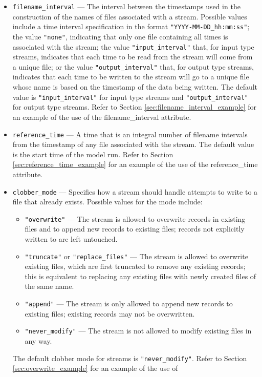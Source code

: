 \begin{itemize}
\item {\tt filename\_interval} --- The interval between the timestamps used in the construction of the names of files associated with
a stream. Possible values include a time interval specification in the format {\tt "YYYY-MM-DD\_hh:mm:ss"}; the value {\tt "none"}, indicating
that only one file containing all times is associated with the stream; the value {\tt "input\_interval"} that, for input type streams, indicates that
each time to be read from the stream will come from a unique file; or the value {\tt "output\_interval"} that, for output type streams, indicates 
that each time to be written to the stream will go to a unique file whose name is based on the timestamp of the data being written. The default
value is {\tt "input\_interval"} for input type streams and {\tt "output\_interval"} for output type streams. Refer to Section \ref{sec:filename_interval_example}
for an example of the use of the filename\_interval attribute.
\item {\tt reference\_time} --- A time that is an integral number of filename intervals from the timestamp of any file associated with the stream.
The default value is the start time of the model run. Refer to Section \ref{sec:reference_time_example} for an example of the use of the reference\_time
attribute.
\item {\tt clobber\_mode} --- Specifies how a stream should handle attempts to write to a file that already exists. Possible values
for the mode include:
\begin{itemize}
\item {\tt "overwrite"} --- The stream is allowed to overwrite records in existing files and to append new records 
to existing files; records not explicitly written to are left untouched.
\item {\tt "truncate"} or {\tt "replace\_files"} --- The stream is allowed to overwrite existing files, which are first truncated 
to remove any existing records; this is equivalent to replacing any existing files with newly created files of the same name.
\item {\tt "append"} --- The stream is only allowed to append new records to existing files; existing records may not be overwritten.
\item {\tt "never\_modify"} --- The stream is not allowed to modify existing files in any way.
\end{itemize}
The default clobber mode for streams is {\tt "never\_modify"}. Refer to Section \ref{sec:overwrite_example} for an example of the use of

\end{itemize}
